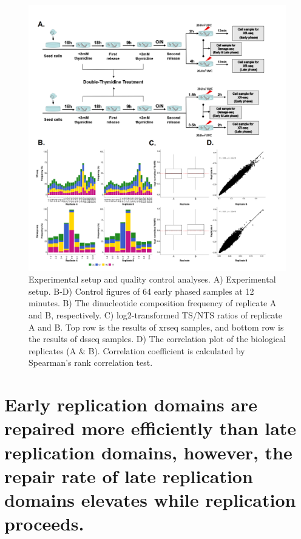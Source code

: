\shorthandoff{=}
\begin{figure}[H]
    \begin{center}
    \includegraphics[width=\textwidth]{Chapters/4_results/figures/fig1}
    \caption[Experimental setup and quality control analyses.]{Experimental setup and quality control analyses. A) Experimental setup. B-D) Control figures of \gls{64} early phased samples at 12 minutes. B) The dinucleotide composition frequency of replicate A and B, respectively. C) log2-transformed TS/NTS ratios of replicate A and B. Top row is the results of \gls{xrseq} samples, and bottom row is the results of \gls{dsseq} samples. D) The correlation plot of the biological replicates (A \& B). Correlation coefficient is calculated by Spearman’s rank correlation test.}
    \label{fig:intro}
    \end{center}
    \end{figure}


\section{Early replication domains are repaired more efficiently than late replication domains, however, the repair rate of late replication domains elevates while replication proceeds.}

